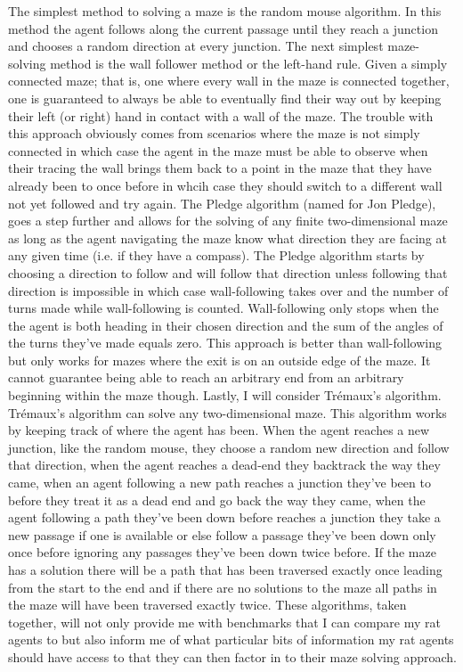 \documentclass[12pt]{article}
\begin{document}
\hspace*{\parindent} The simplest method to solving a maze is the random mouse algorithm. In this method the agent follows along the current passage until they reach a junction and chooses a random direction at every junction. The next simplest maze-solving method is the wall follower method or the left-hand rule. Given a simply connected maze; that is, one where every wall in the maze is connected together, one is guaranteed to always be able to eventually find their way out by keeping their left (or right) hand in contact with a wall of the maze. The trouble with this approach obviously comes from scenarios where the maze is not simply connected in which case the agent in the maze must be able to observe when their tracing the wall brings them back to a point in the maze that they have already been to once before in whcih case they should switch to a different wall not yet followed and try again. The Pledge algorithm (named for Jon Pledge), goes a step further and allows for the solving of any finite two-dimensional maze as long as the agent navigating the maze know what direction they are facing at any given time (i.e. if they have a compass). The Pledge algorithm starts by choosing a direction to follow and will follow that direction unless following that direction is impossible in which case wall-following takes over and the number of turns made while wall-following is counted. Wall-following only stops when the the agent is both heading in their chosen direction and the sum of the angles of the turns they've made equals zero. This approach is better than wall-following but only works for mazes where the exit is on an outside edge of the maze. It cannot guarantee being able to reach an arbitrary end from an arbitrary beginning within the maze though. Lastly, I will consider Tr\'{e}maux's algorithm. Tr\'{e}maux's algorithm can solve any two-dimensional maze. This algorithm works by keeping track of where the agent has been. When the agent reaches a new junction, like the random mouse, they choose a random new direction and follow that direction, when the agent reaches a dead-end they backtrack the way they came, when an agent following a new path reaches a junction they've been to before they treat it as a dead end and go back the way they came, when the agent following a path they've been down before reaches a junction they take a new passage if one is available or else follow a passage they've been down only once before ignoring any passages they've been down twice before. If the maze has a solution there will be a path that has been traversed exactly once leading from the start to the end and if there are no solutions to the maze all paths in the maze will have been traversed exactly twice. These algorithms, taken together, will not only provide me with benchmarks that I can compare my rat agents to but also inform me of what particular bits of information my rat agents should have access to that they can then factor in to their maze solving approach.
\end{document}
